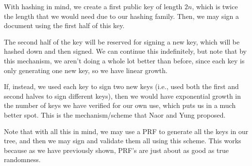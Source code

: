 \documentclass[11pt]{article}
\begin{document}
With hashing in mind, we create a first public key of length \(2n\), which is twice the length that we would need due to our hashing family. Then, we may sign a document using the first half of this key.\smallskip

The second half of the key will be reserved for signing a new key, which will be hashed down and then signed. We can continue this indefinitely, but note that by this mechanism, we aren't doing a whole lot better than before, since each key is only generating one new key, so we have linear growth.\medskip

If, instead, we used each key to sign two new keys (i.e., used both the first and second halves to sign different keys), then we would have exponential growth in the number of keys we have verified for our own use, which puts us in a much better spot. This is the mechanism/scheme that Naor and Yung proposed.

Note that with all this in mind, we may use a PRF to generate all the keys in our tree, and then we may sign and validate them all using this scheme. This works because as we have previously shown, PRF's are just about as good as true randomness.
\end{document}
